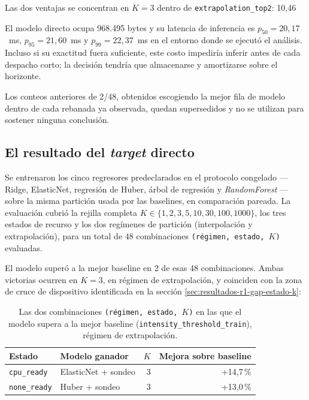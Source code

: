 \documentclass[12pt,oneside,spanish]{book}
\begin{document}
Las dos ventajas se concentran en $K=3$ dentro de \texttt{extrapolation\_top2}: 10,46\,%

El modelo directo ocupa 968.495 bytes y su latencia de inferencia es $p_{50}=20,17$~ms, $p_{95}=21,60$~ms y $p_{99}=22,37$~ms en el entorno donde se ejecutó el análisis. Incluso si su exactitud fuera suficiente, este costo impediría inferir antes de cada despacho corto; la decisión tendría que almacenarse y amortizarse sobre el horizonte.

Los conteos anteriores de 2/48, obtenidos escogiendo la mejor fila de modelo dentro de cada rebanada ya observada, quedan supersedidos y no se utilizan para sostener ninguna conclusión.

\iffalse

\subsection{El resultado del \textit{target} directo}
\label{sec:resultados-r2-directo}

Se entrenaron los cinco regresores predeclarados en el protocolo congelado --- Ridge, ElasticNet, regresión de Huber, árbol de regresión y \textit{RandomForest} --- sobre la misma partición usada por las baselines, en comparación pareada. La evaluación cubrió la rejilla completa $K \in \{1, 2, 3, 5, 10, 30, 100, 1000\}$, los tres estados de recurso y los dos regímenes de partición (interpolación y extrapolación), para un total de 48 combinaciones \texttt{(régimen, estado, $K$)} evaluadas.

El modelo superó a la mejor baseline en 2 de esas 48 combinaciones. Ambas victorias ocurren en $K=3$, en régimen de extrapolación, y coinciden con la zona de cruce de dispositivo identificada en la sección \ref{sec:resultados-r1-gap-estado-k}:

\begin{table}[H]
\centering
\caption[Victorias del modelo sobre la mejor baseline en R2]{Las dos combinaciones \texttt{(régimen, estado, $K$)} en las que el modelo supera a la mejor baseline (\texttt{intensity\_threshold\_train}), régimen de extrapolación.}
\label{tab:r2-victorias}
\begin{tabular}{llrr}
\toprule
\textbf{Estado} & \textbf{Modelo ganador} & \textbf{$K$} & \textbf{Mejora sobre baseline} \\
\midrule
\texttt{cpu\_ready}  & ElasticNet + sondeo & 3 & +14,7\,\% \\
\texttt{none\_ready} & Huber + sondeo      & 3 & +13,0\,\% \\
\bottomrule
\end{tabular}
\end{table}
\end{document}

